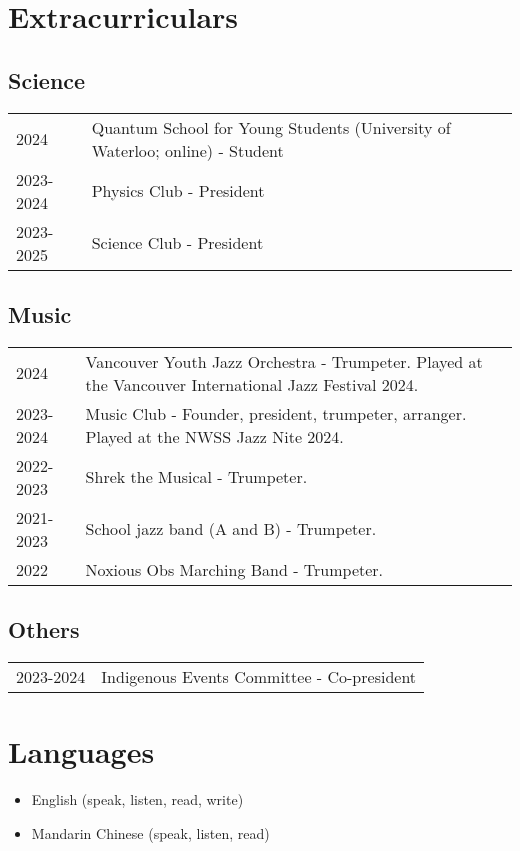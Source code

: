 \documentclass{article}
\begin{document}
\section*{Extracurriculars}

\subsection*{Science}

\begin{tabular}{@{}ll}
	2024      & Quantum School for Young Students (University of Waterloo; online) - Student \\
	2023-2024 & Physics Club - President                                                     \\
	2023-2025 & Science Club - President
\end{tabular}

\subsection*{Music}

\begin{tabular}{@{}ll}
	2024      & Vancouver Youth Jazz Orchestra - Trumpeter. Played at the Vancouver International Jazz Festival 2024. \\
	2023-2024 & Music Club - Founder, president, trumpeter, arranger. Played at the NWSS Jazz Nite 2024.              \\
	2022-2023 & Shrek the Musical - Trumpeter.                                                                        \\
	2021-2023 & School jazz band (A and B) - Trumpeter.                                                               \\
	2022      & Noxious Obs Marching Band - Trumpeter.
\end{tabular}

\subsection*{Others}

\begin{tabular}{@{}ll}
	2023-2024 & Indigenous Events Committee - Co-president
\end{tabular}

\section*{Languages}

\begin{itemize}
	\item English (speak, listen, read, write)
	\item Mandarin Chinese (speak, listen, read)
\end{itemize}
\end{document}
